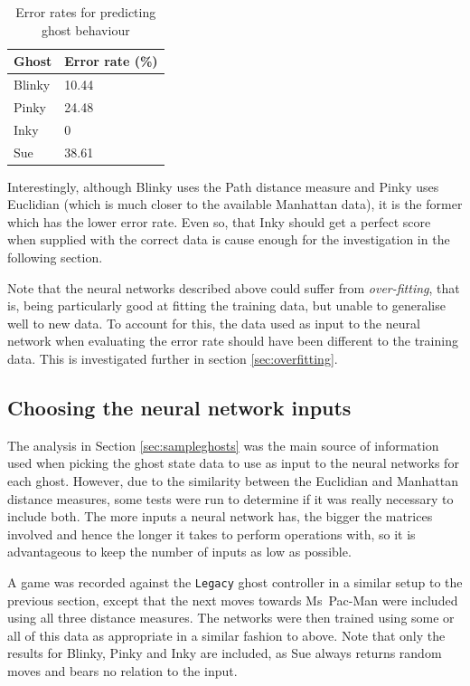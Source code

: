 \begin{table}[ht]
\centering
\begin{tabular}{ll}
\toprule
Ghost & Error rate (\%) \\
\midrule
Blinky & 10.44 \\
Pinky & 24.48 \\
Inky & 0 \\
Sue & 38.61 \\
\bottomrule
\end{tabular}
\caption{Error rates for predicting ghost behaviour}
\label{tab:proofconcept}
\end{table}

Interestingly, although Blinky uses the Path distance measure and Pinky uses Euclidian (which is much closer to the available Manhattan data), it is the former which has the lower error rate.  Even so, that Inky should get a perfect score when supplied with the correct data is cause enough for the investigation in the following section.

Note that the neural networks described above could suffer from \emph{over-fitting}, that is, being particularly good at fitting the training data, but unable to generalise well to new data.  To account for this, the data used as input to the neural network when evaluating the error rate should have been different to the training data.  This is investigated further in section \ref{sec:overfitting}.

\subsection{Choosing the neural network inputs}

The analysis in Section \ref{sec:sampleghosts} was the main source of information used when picking the ghost state data to use as input to the neural networks for each ghost.  However, due to the similarity between the Euclidian and Manhattan distance measures, some tests were run to determine if it was really necessary to include both.  The more inputs a neural network has, the bigger the matrices involved and hence the longer it takes to perform operations with, so it is advantageous to keep the number of inputs as low as possible.

A game was recorded against the {\tt Legacy} ghost controller in a similar setup to the previous section, except that the next moves towards Ms~Pac-Man were included using all three distance measures.  The networks were then trained using some or all of this data as appropriate in a similar fashion to above.  Note that only the results for Blinky, Pinky and Inky are included, as Sue always returns random moves and bears no relation to the input.

